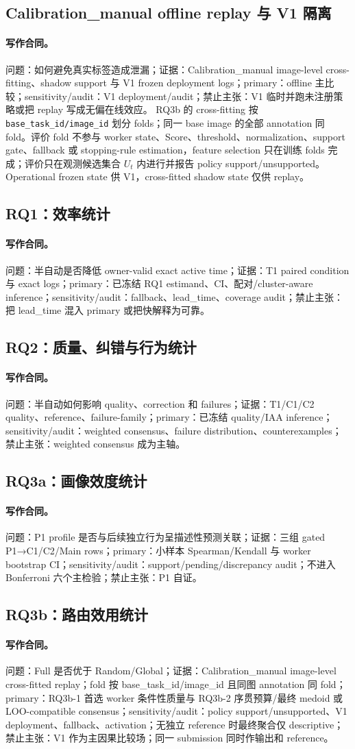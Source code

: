 \documentclass[UTF8,a4paper,12pt]{ctexart}
\newcommand{\contract}[5]{\paragraph{写作合同。}问题：#1；证据：#2；primary：#3；sensitivity/audit：#4；禁止主张：#5。}
\begin{document}
\subsection{Calibration\_manual offline replay 与 V1 隔离}
\contract{如何避免真实标签造成泄漏}{Calibration\_manual image-level cross-fitting、shadow support 与 V1 frozen deployment logs}{offline 主比较}{V1 deployment/audit}{V1 临时并跑未注册策略或把 replay 写成无偏在线效应}
RQ3b 的 cross-fitting 按 \texttt{base\_task\_id/image\_id} 划分 folds；同一 base image 的全部 annotation 同 fold。评价 fold 不参与 worker state、Score、threshold、normalization、support gate、fallback 或 stopping-rule estimation，feature selection 只在训练 folds 完成；评价只在观测候选集合 $U_t$ 内进行并报告 policy support/unsupported。Operational frozen state 供 V1，cross-fitted shadow state 仅供 replay。
\subsection{RQ1：效率统计}
\contract{半自动是否降低 owner-valid exact active time}{T1 paired condition 与 exact logs}{已冻结 RQ1 estimand、CI、配对/cluster-aware inference}{fallback、lead\_time、coverage audit}{把 lead\_time 混入 primary 或把快解释为可靠}
\subsection{RQ2：质量、纠错与行为统计}
\contract{半自动如何影响 quality、correction 和 failures}{T1/C1/C2 quality、reference、failure-family}{已冻结 quality/IAA inference}{weighted consensus、failure distribution、counterexamples}{weighted consensus 成为主轴}
\subsection{RQ3a：画像效度统计}
\contract{P1 profile 是否与后续独立行为呈描述性预测关联}{三组 gated P1→C1/C2/Main rows}{小样本 Spearman/Kendall 与 worker bootstrap CI}{support/pending/discrepancy audit；不进入 Bonferroni 六个主检验}{P1 自证}
\subsection{RQ3b：路由效用统计}
\contract{Full 是否优于 Random/Global}{Calibration\_manual image-level cross-fitted replay；fold 按 base\_task\_id/image\_id 且同图 annotation 同 fold}{RQ3b-1 首选 worker 条件性质量与 RQ3b-2 序贯预算/最终 medoid 或 LOO-compatible consensus}{policy support/unsupported、V1 deployment、fallback、activation；无独立 reference 时最终聚合仅 descriptive}{V1 作为主因果比较场；同一 submission 同时作输出和 reference}
\end{document}
